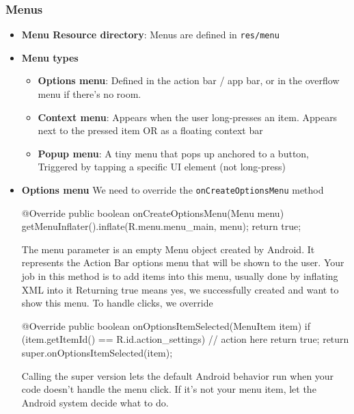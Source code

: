 \documentclass{report}
\begin{document}
    \subsubsection{Menus}
    \begin{itemize}
        \item \textbf{Menu Resource directory}: Menus are defined in \texttt{res/menu}
        \item \textbf{Menu types}
            \begin{itemize}
                \item \textbf{Options menu}: Defined in the action bar / app bar, or in the overflow menu if there's no room.
                \item \textbf{Context menu}: Appears when the user long-presses an item. Appears next to the pressed item OR as a floating context bar
                \item \textbf{Popup menu}: A tiny menu that pops up anchored to a button, Triggered by tapping a specific UI element (not long-press)
            \end{itemize}
        \item \textbf{Options menu}
            \bigbreak \noindent 
            \bigbreak \noindent 
            We need to override the \texttt{onCreateOptionsMenu} method
            \bigbreak \noindent 
            \begin{javacode}
                @Override
                public boolean onCreateOptionsMenu(Menu menu) {
                    getMenuInflater().inflate(R.menu.menu_main, menu);
                    return true;
                }
            \end{javacode}
            \bigbreak \noindent 
            The menu parameter is an empty Menu object created by Android. It represents the Action Bar options menu that will be shown to the user.
            \bigbreak \noindent 
            Your job in this method is to add items into this menu, usually done by inflating XML into it
            \bigbreak \noindent 
            Returning true means yes, we successfully created and want to show this menu.
            \bigbreak \noindent 
            To handle clicks, we override
            \bigbreak \noindent 
            \begin{javacode}
                @Override
                public boolean onOptionsItemSelected(MenuItem item) {
                    if (item.getItemId() == R.id.action_settings) {
                        // action here
                        return true;
                    }
                    return super.onOptionsItemSelected(item);
                }
            \end{javacode}
            \bigbreak \noindent 
            Calling the super version lets the default Android behavior run when your code doesn’t handle the menu click. If it’s not your menu item, let the Android system decide what to do.


\end{itemize}
\end{document}
